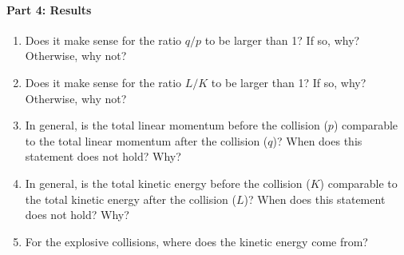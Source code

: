 \paragraph{Part 4: Results}
%
\begin{enumerate}
    \item Does it make sense for the ratio $q/p$ to be larger than 1? If so, why? Otherwise, why not?
    \item Does it make sense for the ratio $L/K$ to be larger than 1? If so, why? Otherwise, why not?
    \item In general, is the total linear momentum before the collision ($p$) comparable to the total linear momentum after the collision ($q$)? When does this statement does not hold? Why?
    \item In general, is the total kinetic energy before the collision ($K$) comparable to the total kinetic energy after the collision ($L$)? When does this statement does not hold? Why?
    \item For the explosive collisions, where does the kinetic energy come from?
\end{enumerate}
%
\newpage
